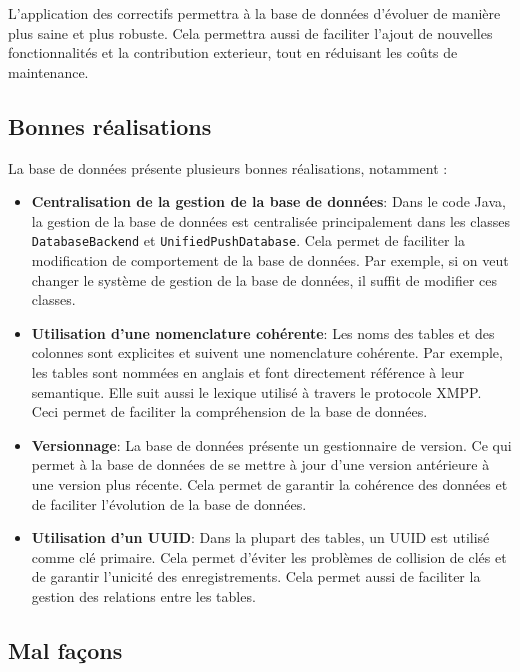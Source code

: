 \documentclass[a4paper,11pt]{article}
\begin{document}
L'application des correctifs permettra à la base de données d'évoluer de manière plus saine et plus robuste. Cela permettra aussi de faciliter l'ajout de nouvelles fonctionnalités et la contribution exterieur, tout en réduisant les coûts de maintenance.

\subsection*{Bonnes réalisations}

La base de données présente plusieurs bonnes réalisations, notamment :

\begin{itemize}
	\item \textbf{Centralisation de la gestion de la base de données}: Dans le code Java, la gestion de la base de données est centralisée principalement dans les classes \texttt{DatabaseBackend} et \texttt{UnifiedPushDatabase}. Cela permet de faciliter la modification de comportement de la base de données. Par exemple, si on veut changer le système de gestion de la base de données, il suffit de modifier ces classes.
	
	\item \textbf{Utilisation d'une nomenclature cohérente}: Les noms des tables et des colonnes sont explicites et suivent une nomenclature cohérente. Par exemple, les tables sont nommées en anglais et font directement référence à leur semantique. Elle suit aussi le lexique utilisé à travers le protocole XMPP. Ceci permet de faciliter la compréhension de la base de données.
	
	\item \textbf{Versionnage}: La base de données présente un gestionnaire de version. Ce qui permet à la base de données de se mettre à jour d'une version antérieure à une version plus récente. Cela permet de garantir la cohérence des données et de faciliter l'évolution de la base de données. 
	
	\item \textbf{Utilisation d'un UUID}: Dans la plupart des tables, un UUID est utilisé comme clé primaire. Cela permet d'éviter les problèmes de collision de clés et de garantir l'unicité des enregistrements. Cela permet aussi de faciliter la gestion des relations entre les tables.
\end{itemize}

\subsection*{Mal façons}
\end{document}
